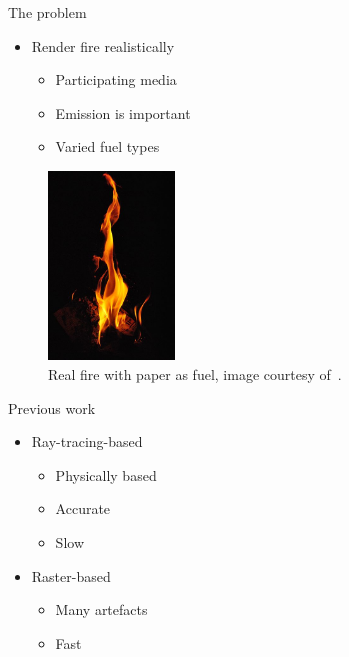 \documentclass{beamer}
\begin{document}
\begin{frame}{The problem}

\begin{multicols}{2}

\begin{itemize}
\setlength\itemsep{0.5em}
\item Render fire realistically 
		\begin{itemize}
		\setlength\itemsep{0.5em}
		\item Participating media 
		\item Emission is important
		\item Varied fuel types
		\end{itemize}
\end{itemize}

\begin{figure}[t!]
\begin{center}
\includegraphics[width=0.3\textwidth]{img/real_fire1} 
\caption*{\tiny{Real fire with paper as fuel, image courtesy of~\cite{real_fire1}.}}
\end{center}
\end{figure}
\end{multicols}


\end{frame}

\begin{frame}{Previous work}

\begin{multicols}{2}

\begin{itemize}
\setlength\itemsep{0.5em}
\item Ray-tracing-based
		\begin{itemize}
		\setlength\itemsep{0.5em}
		\item Physically based 
		\item Accurate
		\item Slow
		\end{itemize}
\item Raster-based
		\begin{itemize}
		\setlength\itemsep{0.5em}
		\item Many artefacts
		\item Fast
		\end{itemize}
\end{itemize}


\end{multicols}


\end{frame}
\end{document}
